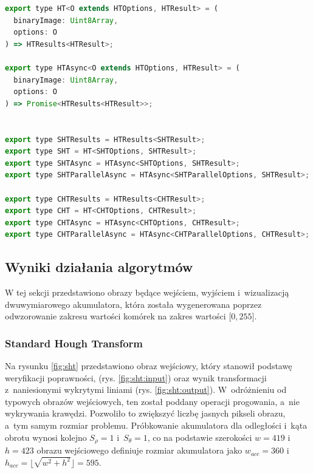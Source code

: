 \begin{lstlisting}[language=JavaScript, float=ht, caption=Definicja typów funkcji wariantu SHT i~CHT,label=lst:meta]
export type HT<O extends HTOptions, HTResult> = (
  binaryImage: Uint8Array,
  options: O
) => HTResults<HTResult>;

export type HTAsync<O extends HTOptions, HTResult> = (
  binaryImage: Uint8Array,
  options: O
) => Promise<HTResults<HTResult>>;


export type SHTResults = HTResults<SHTResult>;
export type SHT = HT<SHTOptions, SHTResult>;
export type SHTAsync = HTAsync<SHTOptions, SHTResult>;
export type SHTParallelAsync = HTAsync<SHTParallelOptions, SHTResult>;

export type CHTResults = HTResults<CHTResult>;
export type CHT = HT<CHTOptions, CHTResult>;
export type CHTAsync = HTAsync<CHTOptions, CHTResult>;
export type CHTParallelAsync = HTAsync<CHTParallelOptions, CHTResult>;
\end{lstlisting}

\subsection{Wyniki działania algorytmów}

W tej sekcji przedstawiono obrazy będące wejściem, wyjściem i~wizualizacją dwuwymiarowego akumulatora, która została wygenerowana poprzez odwzorowanie zakresu wartości komórek na zakres wartości $\lbrack 0, 255\rbrack$.

\subsubsection{Standard Hough Transform}

Na rysunku \ref{fig:sht} przedstawiono obraz wejściowy, który stanowił podstawę weryfikacji poprawności, (rys. \ref{fig:sht:input}) oraz wynik transformacji z~naniesionymi wykrytymi liniami (rys. \ref{fig:sht:output}). W~odróżnieniu od typowych obrazów wejściowych, ten został poddany operacji progowania, a~nie wykrywania krawędzi. Pozwoliło to zwiększyć liczbę jasnych pikseli obrazu, a~tym samym rozmiar problemu. Próbkowanie akumulatora dla odległości i~kąta obrotu wynosi kolejno $S_\rho = 1$ i~$S_\theta = 1$, co na podstawie szerokości $w = 419$ i~$h = 423$ obrazu wejściowego definiuje rozmiar akumulatora jako $w_{acc} = 360$ i~$h_{acc} = \lfloor\sqrt{w^2+h^2}\rfloor = 595$.


